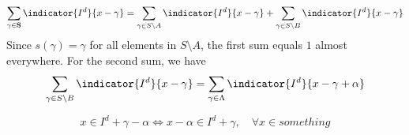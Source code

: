 \begin{align*}
    \sum_{\gamma \in \mathbf{S}} \indicator{I^d}{x-\gamma} = \sum_{\gamma \in S\setminus A} \indicator{I^d}{x-\gamma} +\sum_{\gamma \in S\setminus B} \indicator{I^d}{x-\gamma}
\end{align*}
Since $s(\gamma) = \gamma$ for all elements in $S\setminus A$, the first sum equals $1$ almost everywhere. For the second sum, we have
\begin{align*}
    \sum_{\gamma \in S\setminus B} \indicator{I^d}{x-\gamma} = \sum_{\gamma \in \Lambda} \indicator{I^d}{x-\gamma + \alpha}
\end{align*}

\begin{equation*}
    x\in I^d + \gamma - \alpha \Longleftrightarrow x-\alpha \in I^d + \gamma,  \quad \forall x\in something
\end{equation*}
